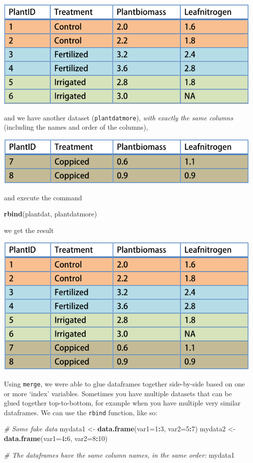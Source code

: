 \documentclass[]{book}
\newenvironment{Shaded}{\begin{snugshade}}{\end{snugshade}}
\newcommand{\CommentTok}[1]{\textcolor[rgb]{0.56,0.35,0.01}{\textit{#1}}}
\newcommand{\DataTypeTok}[1]{\textcolor[rgb]{0.13,0.29,0.53}{#1}}
\newcommand{\DecValTok}[1]{\textcolor[rgb]{0.00,0.00,0.81}{#1}}
\newcommand{\KeywordTok}[1]{\textcolor[rgb]{0.13,0.29,0.53}{\textbf{#1}}}
\newcommand{\NormalTok}[1]{#1}
\newcommand{\OperatorTok}[1]{\textcolor[rgb]{0.81,0.36,0.00}{\textbf{#1}}}
\newcommand{\StringTok}[1]{\textcolor[rgb]{0.31,0.60,0.02}{#1}}
\begin{document}
\includegraphics[width=0.33\linewidth]{screenshots/rbindinput}

and we have another dataset (\texttt{plantdatmore}), \emph{with exactly the same columns} (including the names and order of the columns),

\includegraphics[width=0.33\linewidth]{screenshots/moredataforrbind}

and execute the command

\begin{Shaded}
\begin{Highlighting}[]
\KeywordTok{rbind}\NormalTok{(plantdat, plantdatmore)}
\end{Highlighting}
\end{Shaded}

we get the result

\includegraphics[width=0.33\linewidth]{screenshots/rbindresult}

Using \texttt{merge}, we were able to glue dataframes together side-by-side based on one or more `index' variables. Sometimes you have multiple datasets that can be glued together top-to-bottom, for example when you have multiple very similar dataframes. We can use the \texttt{rbind} function, like so:

\begin{Shaded}
\begin{Highlighting}[]
\CommentTok{# Some fake data}
\NormalTok{mydata1 <-}\StringTok{ }\KeywordTok{data.frame}\NormalTok{(}\DataTypeTok{var1=}\DecValTok{1}\OperatorTok{:}\DecValTok{3}\NormalTok{, }\DataTypeTok{var2=}\DecValTok{5}\OperatorTok{:}\DecValTok{7}\NormalTok{) }
\NormalTok{mydata2 <-}\StringTok{ }\KeywordTok{data.frame}\NormalTok{(}\DataTypeTok{var1=}\DecValTok{4}\OperatorTok{:}\DecValTok{6}\NormalTok{, }\DataTypeTok{var2=}\DecValTok{8}\OperatorTok{:}\DecValTok{10}\NormalTok{) }

\CommentTok{# The dataframes have the same column names, in the same order:}
\NormalTok{mydata1}
\end{Highlighting}
\end{Shaded}
\end{document}
